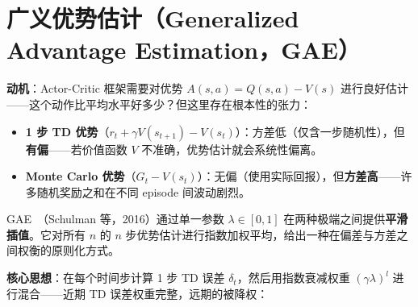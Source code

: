 \section{广义优势估计（Generalized Advantage Estimation，GAE）}
\label{generalized-advantage-estimation-gae}

\textbf{动机}：Actor-Critic 框架需要对优势 $A(s,a) = Q(s,a) - V(s)$ 进行良好估计——这个动作比平均水平好多少？但这里存在根本性的张力：

\begin{itemize}
  \item \textbf{1 步 TD 优势}（$r_t + \gamma V(s_{t+1}) - V(s_t)$）：方差低（仅含一步随机性），但\textbf{有偏}——若价值函数 $V$ 不准确，优势估计就会系统性偏离。
  \item \textbf{Monte Carlo 优势}（$G_t - V(s_t)$）：无偏（使用实际回报），但\textbf{方差高}——许多随机奖励之和在不同 episode 间波动剧烈。
\end{itemize}

GAE~\cite{schulman2016high}（Schulman 等，2016）通过单一参数 $\lambda \in [0, 1]$ 在两种极端之间提供\textbf{平滑插值}。它对所有 $n$ 的 $n$ 步优势估计进行指数加权平均，给出一种在偏差与方差之间权衡的原则化方式。

\textbf{核心思想}：在每个时间步计算 1 步 TD 误差 $\delta_t$，然后用指数衰减权重 $(\gamma\lambda)^l$ 进行混合——近期 TD 误差权重完整，远期的被降权：


